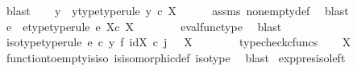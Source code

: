 \begin{isabellebody}
\ blast\isanewline
\ \ \isamarkupfalse%
\ y\ \ y{\isacharunderscore}{\kern0pt}type{\isacharbrackleft}{\kern0pt}type{\isacharunderscore}{\kern0pt}rule{\isacharbrackright}{\kern0pt}{\isacharcolon}{\kern0pt}\ {\isachardoublequoteopen}y\ {\isasymin}\isactrlsub c\ X{\isachardoublequoteclose}\isanewline
\ \ \ \ \isamarkupfalse%
\ assms\ nonempty{\isacharunderscore}{\kern0pt}def\ \isamarkupfalse%
\ blast\isanewline
\ \ \isamarkupfalse%
\ e\ \ e{\isacharunderscore}{\kern0pt}type{\isacharbrackleft}{\kern0pt}type{\isacharunderscore}{\kern0pt}rule{\isacharbrackright}{\kern0pt}{\isacharcolon}{\kern0pt}\ {\isachardoublequoteopen}e{\isacharcolon}{\kern0pt}\ X{\isasymtimes}\isactrlsub c\ {\isasymemptyset}\isactrlbsup X\isactrlesup \ {\isasymrightarrow}\ {\isasymemptyset}{\isachardoublequoteclose}\isanewline
\ \ \ \ \isamarkupfalse%
\ eval{\isacharunderscore}{\kern0pt}func{\isacharunderscore}{\kern0pt}type\ \isamarkupfalse%
\ blast\isanewline
\ \ \isamarkupfalse%
\ iso{\isacharunderscore}{\kern0pt}type{\isacharbrackleft}{\kern0pt}type{\isacharunderscore}{\kern0pt}rule{\isacharbrackright}{\kern0pt}{\isacharcolon}{\kern0pt}\ {\isachardoublequoteopen}{\isacharparenleft}{\kern0pt}e\ {\isasymcirc}\isactrlsub c\ y\ {\isasymtimes}\isactrlsub f\ id{\isacharparenleft}{\kern0pt}{\isasymemptyset}\isactrlbsup X\isactrlesup {\isacharparenright}{\kern0pt}{\isacharparenright}{\kern0pt}\ {\isasymcirc}\isactrlsub c\ j\ {\isacharcolon}{\kern0pt}\ \ {\isasymemptyset}\isactrlbsup X\isactrlesup \ {\isasymrightarrow}\ {\isasymemptyset}{\isachardoublequoteclose}\isanewline
\ \ \ \ \isamarkupfalse%
\ typecheck{\isacharunderscore}{\kern0pt}cfuncs\isanewline
\ \ \isamarkupfalse%
\ {\isachardoublequoteopen}{\isasymemptyset}\isactrlbsup X\isactrlesup \ {\isasymcong}\ {\isasymemptyset}{\isachardoublequoteclose}\isanewline
\ \ \ \ \isamarkupfalse%
\ function{\isacharunderscore}{\kern0pt}to{\isacharunderscore}{\kern0pt}empty{\isacharunderscore}{\kern0pt}is{\isacharunderscore}{\kern0pt}iso\ is{\isacharunderscore}{\kern0pt}isomorphic{\isacharunderscore}{\kern0pt}def\ iso{\isacharunderscore}{\kern0pt}type\ \isamarkupfalse%
\ blast\isanewline
{}\isamarkupfalse%
%
\endisatagproof
{\isafoldproof}%
%
\isadelimproof
\isanewline
%
\endisadelimproof
\isanewline
{}\isamarkupfalse%
\ exp{\isacharunderscore}{\kern0pt}pres{\isacharunderscore}{\kern0pt}iso{\isacharunderscore}{\kern0pt}left{\isacharcolon}{\kern0pt}\isanewline

\end{isabellebody}
